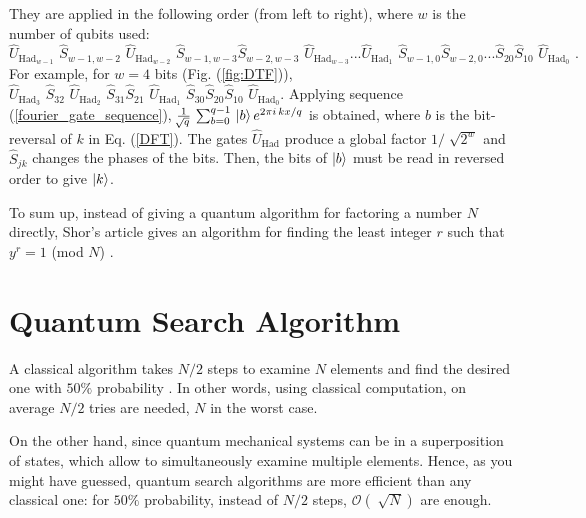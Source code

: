 \documentclass[11pt]{article}
\numberwithin{equation}{section} %
\numberwithin{figure}{section} %
\begin{document}
\begin{appendices}
They are applied in the following order (from left to right), where $w$ is the number of qubits used: $\,\,$ \cite[p.~13, Eq.~(4.4)]{Shor}
\begin{equation} \label{fourier_gate_sequence}
\hat{U}_{\textrm{Had}_{w-1}} \,\,\hat{S}_{w-1,w-2} \,\,\hat{U}_{\textrm{Had}_{w-2}} \,\,\hat{S}_{w-1,w-3}\hat{S}_{w-2,w-3} \,\,\hat{U}_{\textrm{Had}_{w-3}}...\hat{U}_{\textrm{Had}_{1}}\,\,\hat{S}_{w-1,0}\hat{S}_{w-2,0}...\hat{S}_{20}\hat{S}_{10}\,\,\hat{U}_{\textrm{Had}_{0}}\,\,\textrm{.}
\end{equation} 
For example, for $w=4$ bits (Fig. (\ref{fig:DTF})), $\hat{U}_{\textrm{Had}_{3}} \,\,\hat{S}_{32} \,\,\hat{U}_{\textrm{Had}_{2}} \,\,\hat{S}_{31}\hat{S}_{21} \,\,\hat{U}_{\textrm{Had}_{1}}\,\,\hat{S}_{30}\hat{S}_{20}\hat{S}_{10}\,\,\hat{U}_{\textrm{Had}_{0}}$. Applying  sequence (\ref{fourier_gate_sequence}), $\frac{1}{\sqrt[]{q}}\,\sum_{b=0}^{q-1}\,\ket{b}e^{2\pi i\,kx/q}$ is obtained, where $b$ is the bit-reversal of $k$ in Eq. (\ref{DFT}). The gates $\hat{U}_\textrm{Had}$ produce a global factor $1/\sqrt[]{2^w}$ and $\hat{S}_{jk}$ changes the phases of the bits. Then, the bits of $\ket{b}$ must be read in reversed order to give $\ket{k}$.

To sum up, instead of giving a quantum algorithm for factoring a number $N$ directly, Shor's article gives an algorithm for finding the least integer $r$ such that $y^r=1$ (mod $N$) \cite[p.~15, l.~17]{Shor}. %


\vspace{1cm}
\section{Quantum Search Algorithm} \label{quantum_search_algorithm}

A classical algorithm takes $N/2$ steps to examine $N$ elements and find the desired one with $50\%$ probability \cite[p.~1, l.~1-11]{Grover}. In other words, using classical computation, on average $N/2$ tries are needed, $N$ in the worst case.

On the other hand, since quantum mechanical systems can be in  a superposition of states, which allow to simultaneously examine multiple elements. Hence, as you might have guessed, quantum search algorithms are more efficient than any classical one: for $50\%$ probability, instead of $N/2$ steps, $\mathcal{O}(\sqrt[]{N})$ are enough.
	

\end{appendices}
\end{document}
